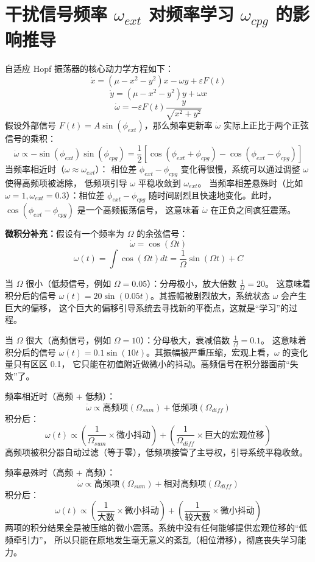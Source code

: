 \documentclass[12pt, a4paper]{ctexart}
\begin{document}
\section{干扰信号频率 $\omega_{ext}$ 对频率学习 $\omega_{cpg}$ 的影响推导}
自适应 Hopf 振荡器的核心动力学方程如下：
$$\dot{x} = (\mu - x^2 - y^2)x - \omega y + \varepsilon F(t)$$
$$\dot{y} = (\mu - x^2 - y^2)y + \omega x$$
$$\dot{\omega} = -\varepsilon F(t) \frac{y}{\sqrt{x^2 + y^2}}$$
假设外部信号 $F(t) = A \sin(\phi_{ext})$，那么频率更新率 $\dot{\omega}$ 实际上正比于两个正弦信号的乘积：
$$\dot{\omega} \propto -\sin(\phi_{ext}) \sin(\phi_{cpg}) = \frac{1}{2} [\cos(\phi_{ext} + \phi_{cpg}) - \cos(\phi_{ext} - \phi_{cpg})]$$
当频率相近时（$\omega \approx \omega_{ext}$）：
相位差 $\phi_{ext} - \phi_{cpg}$ 变化得很慢，系统可以通过调整 $\omega$ 使得高频项被滤除，
低频项引导 $\omega$ 平稳收敛到 $\omega_{ext}$。
当频率相差悬殊时（比如 $\omega = 1, \omega_{ext} = 0.3$）：相位差 $\phi_{ext} - \phi_{cpg}$ 
随时间剧烈且快速地变化。此时，$\cos(\phi_{ext} - \phi_{cpg})$ 是一个高频振荡信号，
这意味着 $\dot{\omega}$ 在正负之间疯狂震荡。

\textbf{微积分补充：}假设有一个频率为 $\Omega$ 的余弦信号：$$\dot{\omega} = \cos(\Omega t)$$
$$\omega(t) = \int \cos(\Omega t) dt = \frac{1}{\Omega} \sin(\Omega t) + C$$

当 $\Omega$ 很小（低频信号，例如 $\Omega = 0.05$）：分母极小，放大倍数 $\frac{1}{\Omega} = 20$。
这意味着积分后的信号 $\omega(t) = 20 \sin(0.05 t)$。其振幅被剧烈放大，系统状态 $\omega$ 会产生巨大的偏移，
这个巨大的偏移引导系统去寻找新的平衡点，这就是“学习”的过程。

当 $\Omega$ 很大（高频信号，例如 $\Omega = 10$）：分母极大，衰减倍数 $\frac{1}{\Omega} = 0.1$。
这意味着积分后的信号 $\omega(t) = 0.1 \sin(10 t)$。其振幅被严重压缩，宏观上看，$\omega$ 的变化量只有区区 0.1，
它只能在初值附近做微小的抖动。高频信号在积分器面前“失效”了。

频率相近时（高频 + 低频）：
$$\dot{\omega} \propto \text{高频项}(\Omega_{sum}) + \text{低频项}(\Omega_{diff})$$
积分后：$$\omega(t) \propto \left( \frac{1}{\Omega_{sum}} \times \text{微小抖动} \right) + \left( \frac{1}{\Omega_{diff}} \times \text{巨大的宏观位移} \right)$$
高频项被积分器自动过滤（等于零），低频项接管了主导权，引导系统平稳收敛。

频率悬殊时（高频 + 高频）：
$$\dot{\omega} \propto \text{高频项}(\Omega_{sum}) + \text{相对高频项}(\Omega_{diff})$$积分后：$$\omega(t) \propto \left( \frac{1}{\text{大数}} \times \text{微小抖动} \right) + \left( \frac{1}{\text{较大数}} \times \text{微小抖动} \right)$$
两项的积分结果全是被压缩的微小震荡。系统中没有任何能够提供宏观位移的“低频牵引力”，
所以只能在原地发生毫无意义的紊乱（相位滑移），彻底丧失学习能力。
\end{document}
